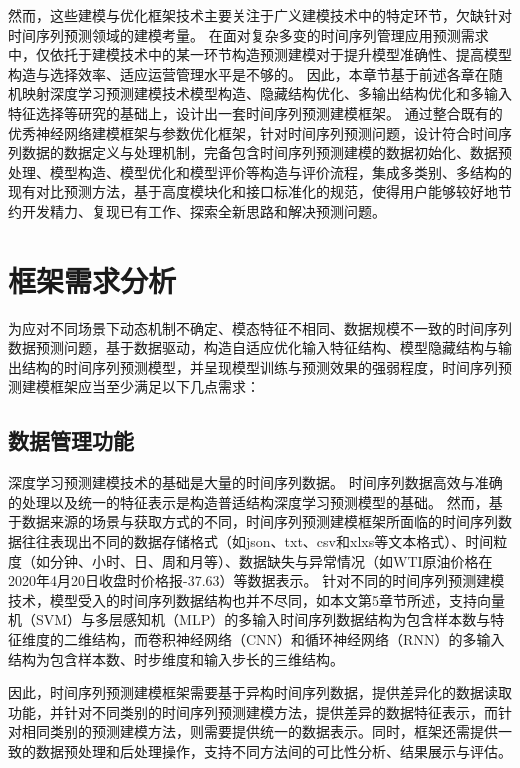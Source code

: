 然而，这些建模与优化框架技术主要关注于广义建模技术中的特定环节，欠缺针对时间序列预测领域的建模考量。
在面对复杂多变的时间序列管理应用预测需求中，仅依托于建模技术中的某一环节构造预测建模对于提升模型准确性、提高模型构造与选择效率、适应运营管理水平是不够的。
因此，本章节基于前述各章在随机映射深度学习预测建模技术模型构造、隐藏结构优化、多输出结构优化和多输入特征选择等研究的基础上，设计出一套时间序列预测建模框架。
通过整合既有的优秀神经网络建模框架与参数优化框架，针对时间序列预测问题，设计符合时间序列数据的数据定义与处理机制，完备包含时间序列预测建模的数据初始化、数据预处理、模型构造、模型优化和模型评价等构造与评价流程，集成多类别、多结构的现有对比预测方法，基于高度模块化和接口标准化的规范，使得用户能够较好地节约开发精力、复现已有工作、探索全新思路和解决预测问题。

\section{框架需求分析}
为应对不同场景下动态机制不确定、模态特征不相同、数据规模不一致的时间序列数据预测问题，基于数据驱动，构造自适应优化输入特征结构、模型隐藏结构与输出结构的时间序列预测模型，并呈现模型训练与预测效果的强弱程度，时间序列预测建模框架应当至少满足以下几点需求：

\subsection{数据管理功能}
深度学习预测建模技术的基础是大量的时间序列数据。
时间序列数据高效与准确的处理以及统一的特征表示是构造普适结构深度学习预测模型的基础。
然而，基于数据来源的场景与获取方式的不同，时间序列预测建模框架所面临的时间序列数据往往表现出不同的数据存储格式（如json、txt、csv和xlxs等文本格式）、时间粒度（如分钟、小时、日、周和月等）、数据缺失与异常情况（如WTI原油价格在2020年4月20日收盘时价格报-37.63）等数据表示。
针对不同的时间序列预测建模技术，模型受入的时间序列数据结构也并不尽同，如本文第5章节所述，支持向量机（SVM）与多层感知机（MLP）的多输入时间序列数据结构为包含样本数与特征维度的二维结构，而卷积神经网络（CNN）和循环神经网络（RNN）的多输入结构为包含样本数、时步维度和输入步长的三维结构。

因此，时间序列预测建模框架需要基于异构时间序列数据，提供差异化的数据读取功能，并针对不同类别的时间序列预测建模方法，提供差异的数据特征表示，而针对相同类别的预测建模方法，则需要提供统一的数据表示。同时，框架还需提供一致的数据预处理和后处理操作，支持不同方法间的可比性分析、结果展示与评估。

